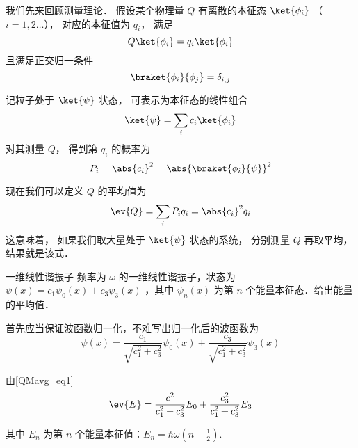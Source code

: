 

我们先来回顾测量理论． 假设某个物理量 $Q$ 有离散的本征态 $\ket{\phi_i}$ （$i = 1,2\dots$）， 对应的本征值为 $q_i$， 满足
\begin{equation}\label{QMavg_eq3}
Q\ket{\phi_i} = q_i \ket{\phi_i}
\end{equation}
且满足正交归一条件
\begin{equation}\label{QMavg_eq4}
\braket{\phi_i}{\phi_j} = \delta_{i,j}
\end{equation}

记粒子处于 $\ket{\psi}$ 状态， 可表示为本征态的线性组合
\begin{equation}\label{QMavg_eq2}
\ket{\psi} = \sum_i c_i \ket{\phi_i}
\end{equation}
对其测量 $Q$， 得到第 $q_i$ 的概率为
\begin{equation}
P_i = \abs{c_i}^2 = \abs{\braket{\phi_i}{\psi}}^2
\end{equation}

现在我们可以定义 $Q$ 的平均值为
\begin{equation}\label{QMavg_eq1}
\ev{Q} = \sum_i P_i q_i = \abs{c_i}^2 q_i
\end{equation}
这意味着， 如果我们取大量处于 $\ket{\psi}$ 状态的系统， 分别测量 $Q$ 再取平均， 结果就是该式．

\begin{example}{一维线性谐振子}
频率为 $\omega$ 的一维线性谐振子，状态为 $\psi(x)=c_1 \psi_0(x)+c_3\psi_3(x)$ ，其中 $\psi_n(x)$ 为第 $n$ 个能量本征态．给出能量的平均值．

首先应当保证波函数归一化，不难写出归一化后的波函数为
\begin{equation}
\psi(x)=\frac{c_1}{\sqrt{c_1^2+c_3^2}}\psi_0(x)+\frac{c_3}{\sqrt{c_1^2+c_3^2}}\psi_3(x)
\end{equation}

由\autoref{QMavg_eq1}
\begin{equation}
\ev{E}=\frac{c_1^2}{c_1^2+c_3^2} E_0+\frac{c_3^2}{c_1^2+c_3^2} E_3
\end{equation}

其中 $E_n$ 为第 $n$ 个能量本征值：$E_n=\hbar \omega(n+\frac{1}{2})$.
\end{example}

